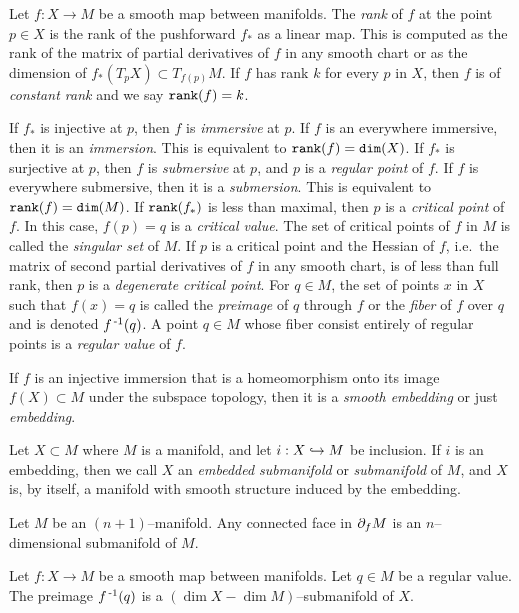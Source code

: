 \begin{defn}[Embedding]
	Let $f:X\to M$ be a smooth map between manifolds.
	The \emph{rank} of $f$ at the point $p\in X$ is the rank of the pushforward $f_*$ as a linear map.
	This is computed as the rank of the matrix of partial derivatives of $f$ in any smooth chart or as the dimension of $f_*(T_p X)\subset T_{f(p)} M$.
	If $f$ has rank $k$ for every $p$ in $X$, then $f$ is of \emph{constant rank} and we say $\texttt{rank}(f)=k$.
		
	If $f_*$ is injective at $p$, then $f$ is \emph{immersive} at $p$.
	If $f$ is an everywhere immersive, then it is an \emph{immersion}.
	This is equivalent to $\texttt{rank}(f)=\texttt{dim}(X)$.
	If $f_*$ is surjective at $p$, then $f$ is \emph{submersive} at $p$, and $p$ is a \emph{regular point} of $f$.
	If $f$ is everywhere submersive, then it is a \emph{submersion}.
	This is equivalent to $\texttt{rank}(f)=\texttt{dim}(M)$.
	If $\texttt{rank}(f_*)$ is less than maximal, then $p$ is a \emph{critical point} of $f$.
	In this case, $f(p)=q$ is a \emph{critical value}.
	The set of critical points of $f$ in $M$ is called the \emph{singular set} of $M$.
	If $p$ is a critical point and the Hessian of $f$, i.e.\ the matrix of second partial derivatives of $f$ in any smooth chart, is of less than full rank, then $p$ is a \emph{degenerate critical point}.
	For $q\in M$, the set of points $x$ in $X$ such that $f(x)=q$ is called the \emph{preimage} of $q$ through $f$ or the \emph{fiber} of $f$ over $q$ and is denoted $f^{\,\text{-}1}(q)$.
	A point $q \in M$ whose fiber consist entirely of regular points is a \emph{regular value} of $f$.
	
	If $f$ is an injective immersion that is a homeomorphism onto its image $f(X)\subset M$ under the subspace topology, then it is a \emph{smooth embedding} or just \emph{embedding}.
	
	Let $X\subset M$ where $M$ is a manifold, and let $i:X\hookrightarrow M$ be inclusion.
	If $i$ is an embedding, then we call $X$ an \emph{embedded submanifold} or \emph{submanifold} of $M$, and $X$ is, by itself, a manifold with smooth structure induced by the embedding.
\end{defn}

\begin{prop}
	\label{prop:boundariesaremanifolds}
	Let $M$ be an $(n+1)$--manifold.
	Any connected face in $\partial_f M$ is an $n$--dimensional submanifold of $M$.
\end{prop}

\begin{theorem}
	Let $f:X\to M$ be a smooth map between manifolds.
	Let $q\in M$ be a regular value.
	The preimage $f^{\,\text{-}1}(q)$ is a $(\dim X-\dim M)$--submanifold of $X$.
\end{theorem}

